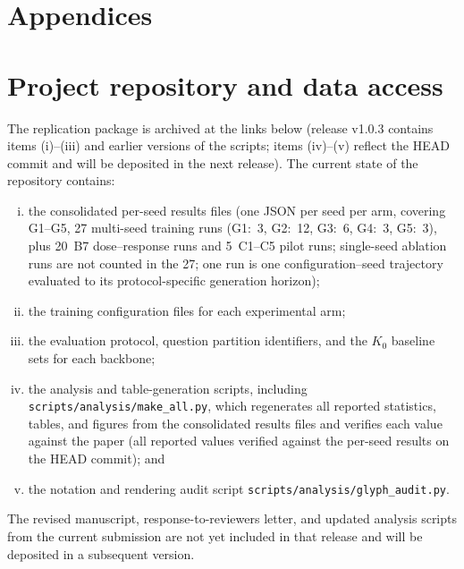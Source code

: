 \documentclass[a4paper,fleqn]{cas-dc}
\newif\ifshowchanges
\newcommand{\rev}[1]{\ifshowchanges{\color{blue}#1}\else{#1}\fi}
\begin{document}



\appendix
\section*{Appendices}

\section{Project repository and data access}\label{app:repo}

\rev{The replication package is archived at the links below (release v1.0.3 contains items (i)--(iii) and earlier versions of the scripts; items (iv)--(v) reflect the HEAD commit and will be deposited in the next release). The current state of the repository contains:
\begin{enumerate}[(i)]
  \item the consolidated per-seed results files (one JSON per seed per arm, covering G1--G5, 27 multi-seed training runs (G1:~3, G2:~12, G3:~6, G4:~3, G5:~3), plus 20~B7 dose--response runs and 5~C1--C5 pilot runs; single-seed ablation runs are not counted in the 27; one run is one configuration--seed trajectory evaluated to its protocol-specific generation horizon);
  \item the training configuration files for each experimental arm;
  \item the evaluation protocol, question partition identifiers, and the $K_0$ baseline sets for each backbone;
  \item the analysis and table-generation scripts, including \texttt{scripts/analysis/make\_all.py}, which regenerates all reported statistics, tables, and figures from the consolidated results files and verifies each value against the paper (\rev{all reported values verified against the per-seed results on the HEAD commit}); and
  \item the notation and rendering audit script \texttt{scripts/analysis/glyph\_audit.py}.
\end{enumerate}
The revised manuscript, response-to-reviewers letter, and updated analysis scripts from the current submission are not yet included in that release and will be deposited in a subsequent version.}
\end{document}
